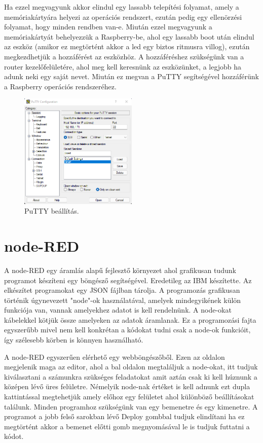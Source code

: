 \documentclass[a4paper,12pt,oneside]{report}
\begin{document}
Ha ezzel megvagyunk akkor elindul egy lassabb telepítési folyamat, amely a memóriakártyára helyezi az operációs rendszert, ezután pedig
egy ellenörzési folyamat, hogy minden rendben van-e.
Miután ezzel megvagyunk a memóriakártyát behelyezzük a Raspberry-be, ahol egy lassabb boot után elindul az eszköz (amikor ez megtörtént
akkor a led egy biztos ritmusra villog), ezután megkezdhetjük a hozzáférést az eszközhöz. 
A hozzáféréshez szükségünk van a router kezelőfelületére, ahol meg kell keresnünk az eszközünket, a legjobb ha adunk neki
egy saját nevet. Miután ez megvan a PuTTY segítségével hozzáférünk a Raspberry operációs rendszeréhez.

\begin{figure}[htbp]
	\centering
	\includegraphics[width=0.5\textwidth]{fig/putty.png}
	\caption{PuTTY beállítás.}
	\label{fig-putty}
\end{figure}

\chapter{node-RED}

A node-RED egy áramlás alapű fejlesztő környezet ahol grafikusan tudunk programot készíteni egy böngésző segítségével. Eredetileg az IBM
készítette. Az elkészítet programokat egy JSON fájlban tárolja. A programozás grafikusan történik úgynevezett "node"-ok használatával,
amelyek mindegyikének külön funkciója van, vannak amelyekhez adatot is kell rendelnünk. A node-okat kábelekkel kötjük össze amelyeken az
adatok áramlanak. Ez a programozási fajta egyszerűbb mivel nem kell konkrétan a kódokat tudni csak a node-ok funkcióit, így
szélesebb körben is könnyen használható.

A node-RED egyszerűen elérhető egy webböngészőből. Ezen az oldalon megjelenik maga az editor, ahol a bal oldalon megtaláljuk a 
node-okat, itt tudjuk kiválasztani a számunkra szükséges feladatokat amit aztán csak ki kell húznunk a középen lévő üres felületre.
Némelyik node-nak értéket is kell adnunk ezt dupla kattintással megtehetjük amely előhoz egy felületet ahol különböző beállításokat
találunk. Minden programhoz szükségünk van egy bemenetre és egy kimenetre. A programot a jobb felső sarokban lévő Deploy gombbal
tudjuk elindítani ha ez megtörtént akkor a bemenet előtti gomb megnyomásával le is tudjuk futtatni a kódot.
\end{document}

